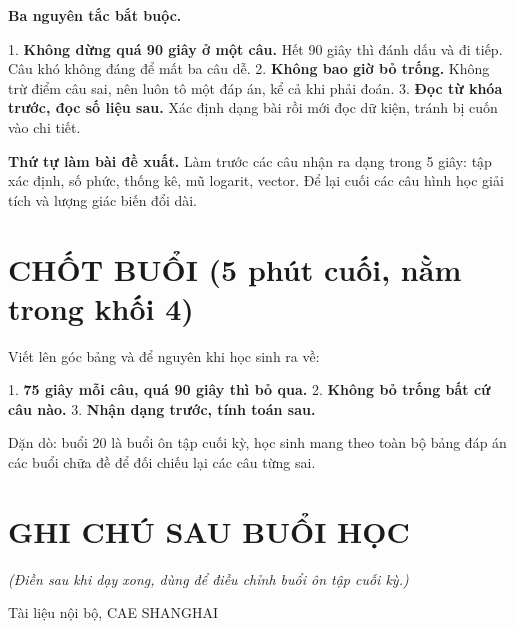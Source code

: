 \documentclass[11pt, a4paper]{article}
\begin{document}
\textbf{Ba nguyên tắc bắt buộc.}

1. \textbf{Không dừng quá 90 giây ở một câu.} Hết 90 giây thì đánh dấu và đi tiếp. Câu khó không đáng để mất ba câu dễ.
2. \textbf{Không bao giờ bỏ trống.} Không trừ điểm câu sai, nên luôn tô một đáp án, kể cả khi phải đoán.
3. \textbf{Đọc từ khóa trước, đọc số liệu sau.} Xác định dạng bài rồi mới đọc dữ kiện, tránh bị cuốn vào chi tiết.

\textbf{Thứ tự làm bài đề xuất.} Làm trước các câu nhận ra dạng trong 5 giây: tập xác định, số phức, thống kê, mũ logarit, vector. Để lại cuối các câu hình học giải tích và lượng giác biến đổi dài.

\section{CHỐT BUỔI (5 phút cuối, nằm trong khối 4)}

Viết lên góc bảng và để nguyên khi học sinh ra về:

1. \textbf{75 giây mỗi câu, quá 90 giây thì bỏ qua.}
2. \textbf{Không bỏ trống bất cứ câu nào.}
3. \textbf{Nhận dạng trước, tính toán sau.}

Dặn dò: buổi 20 là buổi ôn tập cuối kỳ, học sinh mang theo toàn bộ bảng đáp án các buổi chữa đề để đối chiếu lại các câu từng sai.

\section{GHI CHÚ SAU BUỔI HỌC}

\emph{(Điền sau khi dạy xong, dùng để điều chỉnh buổi ôn tập cuối kỳ.)}

\vspace{0.8cm}
\begin{center}
{\footnotesize\color{cae_blue} Tài liệu nội bộ, CAE SHANGHAI}
\end{center}
\end{document}
